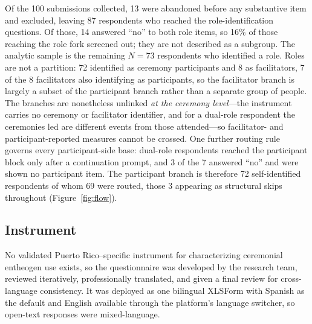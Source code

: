 \documentclass[12pt]{article}
\begin{document}
Of the 100 submissions collected, 13 were abandoned before any substantive item and excluded, leaving 87
respondents who reached the role-identification questions. Of those, 14 answered ``no'' to both role items,
so 16\% of those reaching the role fork screened out; they are not described as a subgroup. The analytic
sample is the remaining $N=73$ respondents who identified a role. Roles are not a partition: 72 identified
as ceremony participants and 8 as facilitators, 7 of the 8 facilitators also identifying as participants,
so the facilitator branch is largely a subset of the participant branch rather than a separate group of
people. The branches are nonetheless unlinked \emph{at the ceremony level}---the instrument carries no
ceremony or facilitator identifier, and for a dual-role respondent the ceremonies led are different events
from those attended---so facilitator- and participant-reported measures cannot be crossed. One further
routing rule governs every participant-side base: dual-role respondents reached the participant block only
after a continuation prompt, and 3 of the 7 answered ``no'' and were shown no participant item. The
participant branch is therefore 72 self-identified respondents of whom 69 were routed, those 3 appearing as
structural skips throughout (Figure~\ref{fig:flow}).

\subsection{Instrument}

No validated Puerto Rico--specific instrument for characterizing ceremonial entheogen use exists, so the
questionnaire was developed by the research team, reviewed iteratively, professionally translated, and
given a final review for cross-language consistency. It was deployed as one bilingual XLSForm with Spanish
as the default and English available through the platform's language switcher, so open-text responses were
mixed-language.
\end{document}
